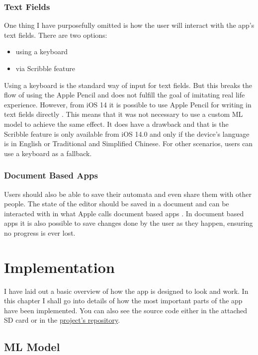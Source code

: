 \subsection{Text Fields}

One thing I have purposefully omitted is how the user will interact with the app's text fields. There are two options:
\begin{itemize}
    \item using a keyboard
    \item via Scribble feature
\end{itemize}

Using a keyboard is the standard way of input for text fields. But this breaks the flow of using the Apple Pencil and does not fulfill the goal of imitating real life experience. However, from iOS 14 it is possible to use Apple Pencil for writing in text fields directly \cite{scribble}. This means that it was not necessary to use a custom ML model to achieve the same effect. It does have a drawback and that is the Scribble feature is only available from iOS 14.0 and only if the device's language is in English or Traditional and Simplified Chinese. For other scenarios, users can use a keyboard as a fallback.

\subsection{Document Based Apps}

Users should also be able to save their automata and even share them with other people. The state of the editor should be saved in a document and can be interacted with in what Apple calls document based apps \cite{document-based}. In document based apps it is also possible to save changes done by the user as they happen, ensuring no progress is ever lost.

\chapter{Implementation}
\label{chap:implementation}

I have laid out a basic overview of how the app is designed to look and work. In this chapter I shall go into details of how the most important parts of the app have been implemented. You can also see the source code either in the attached SD card or in the \href{https://github.com/fortmarek/automata-editor}{project's repository}.

\section{ML Model}

